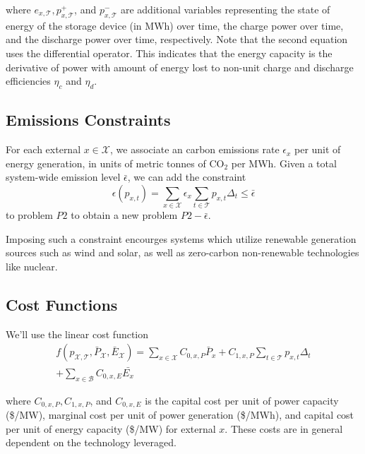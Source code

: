 \documentclass[journal,11pt]{IEEEtran}
\newcommand{\X}{\mathcal{X}}
\newcommand{\T}{\mathcal{T}}
\newcommand{\B}{\mathcal{B}}
\begin{document}
where $e_{x, \T}, p_{x, \T}^{+}$, and $p_{x, \T}^{-}$ are additional
variables representing the state of energy of the storage device (in MWh) over time,
the charge power over time, and the discharge power over time, respectively.
Note that the second equation uses the differential operator. This indicates
that the energy capacity is the derivative of power with amount of energy
lost to non-unit charge and discharge efficiencies $\eta_c$ and $\eta_d$.



\subsection{Emissions Constraints}

For each external $x\in\X$, we associate an carbon emissions rate $\epsilon_x$ per
unit of energy generation, in units of metric tonnes of CO$_2$ per MWh. Given a
total system-wide emission level $\bar{\epsilon}$, we can add the constraint
\begin{equation*}
  \epsilon(p_{x, t}) = \sum_{x\in\X} \epsilon_x \sum_{t\in\T} p_{x, t} \Delta_t \leq \bar{\epsilon}
\end{equation*}
to problem $P2$ to obtain a new problem $P2-\bar{\epsilon}$.

Imposing such a constraint encourges systems which utilize renewable generation
sources such as wind and solar, as well as zero-carbon non-renewable technologies
like nuclear.

\subsection{Cost Functions}
We'll use the linear cost function
\begin{align*}
  f(p_{\X, \T}, \bar{P}_\X, \bar{E}_\X) = \sum_{x\in\X}
    C_{0, x, P} \bar{P}_x + C_{1, x, P} \sum_{t\in\T} {p_{x, t}} \Delta_t \\
    + \sum_{x\in\B} C_{0, x, E} \bar{E_x}
\end{align*}

where $C_{0, x, P}, C_{1, x, P}$, and $C_{0, x, E}$ is the capital cost per
unit of power capacity (\$/MW), marginal cost per unit of power generation (\$/MWh),
and capital cost per unit of energy capacity (\$/MW) for external $x$. These
costs are in general dependent on the technology leveraged.

\end{document}
